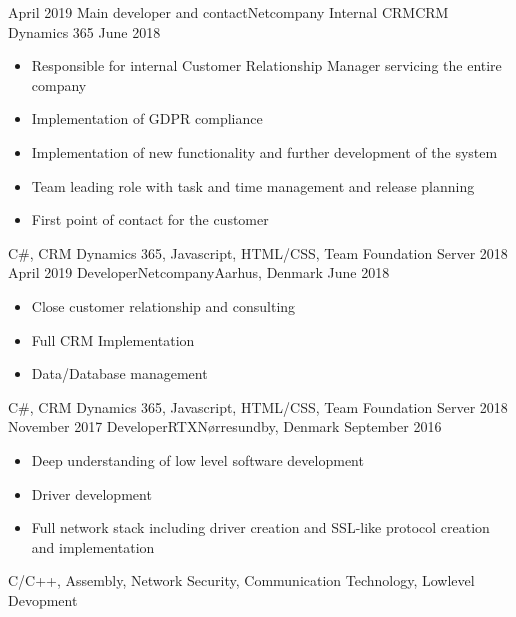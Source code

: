 %
%
%
\begin{experiences}
  \experience
    {April 2019}   {Main developer and contact}{Netcompany Internal CRM}{CRM Dynamics 365}
    {June 2018} {
                      \begin{itemize}
                        \item Responsible for internal Customer Relationship Manager servicing the entire company
                        \item Implementation of GDPR compliance
                        \item Implementation of new functionality and further development of the system
                        \item Team leading role with task and time management and release planning
                        \item First point of contact for the customer
                      \end{itemize}
                    }
                    {C\#, CRM Dynamics 365, Javascript, HTML/CSS, Team Foundation Server 2018}
  \emptySeparator
  \experience
    {April 2019}  {Developer}{Netcompany}{Aarhus, Denmark}
    {June 2018}    {
                      \begin{itemize}
                        \item Close customer relationship and consulting
                        \item Full CRM Implementation
                        \item Data/Database management
                      \end{itemize}
                    }
                    {C\#, CRM Dynamics 365, Javascript, HTML/CSS, Team Foundation Server 2018}
  \emptySeparator
  \experience
    {November 2017}  {Developer}{RTX}{Nørresundby, Denmark}
    {September 2016}    {
                      \begin{itemize}
                        \item Deep understanding of low level software development
                        \item Driver development
                        \item Full network stack including driver creation and SSL-like protocol creation and implementation
                      \end{itemize}
                    }
                    {C/C++, Assembly, Network Security, Communication Technology, Lowlevel Devopment}
\end{experiences}

